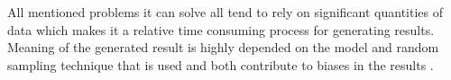 All  mentioned  problems it can solve all tend to rely on significant quantities of data which makes it a relative time consuming process for generating results. Meaning of the generated result is highly depended on the model and random sampling technique that is used and both contribute to biases in the results \cite{stephanie_monte_2015,wikipedia_monte_2019,alon_honig_introduction_nodate}.
